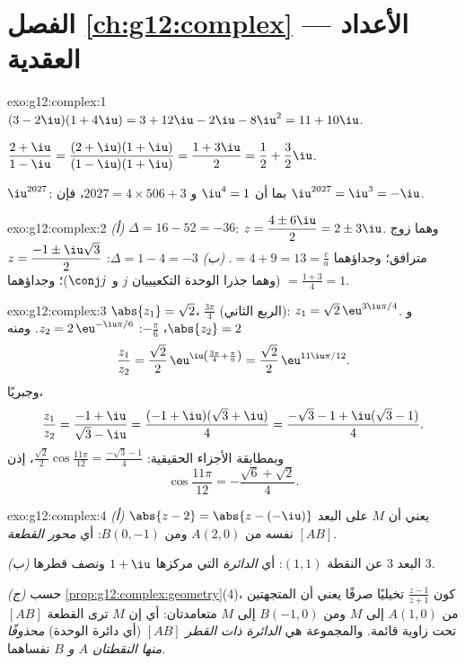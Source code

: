 \section*{الفصل \ref{ch:g12:complex} --- الأعداد العقدية}

\begin{solution}{exo:g12:complex:1}
$(3-2\iu)(1+4\iu) = 3 + 12\iu - 2\iu - 8\iu^2 = 11 + 10\iu$.

$\dfrac{2+\iu}{1-\iu} = \dfrac{(2+\iu)(1+\iu)}{(1-\iu)(1+\iu)}
= \dfrac{1 + 3\iu}{2} = \dfrac12 + \dfrac32\iu$.

$\iu^{2027}$: بما أن $\iu^4 = 1$ و $2027 = 4 \times 506 + 3$، فإن
$\iu^{2027} = \iu^3 = -\iu$.
\end{solution}

\begin{solution}{exo:g12:complex:2}
\emph{(أ)} $\Delta = 16 - 52 = -36$:
$z = \dfrac{4 \pm 6\iu}{2} = 2 \pm 3\iu$. وهما زوج مترافق؛ وجداؤهما
$= 4 + 9 = 13 = \frac ca$. \emph{(ب)} $\Delta = 1 - 4 = -3$:
$z = \dfrac{-1 \pm \iu\sqrt3}{2}$ (وهما جذرا الوحدة التكعيبيان $j$ و
$\conj j$)؛ وجداؤهما $= \frac{1 + 3}{4} = 1$.
\end{solution}

\begin{solution}{exo:g12:complex:3}
$\abs{z_1} = \sqrt2$،  $\frac{3\pi}{4}$ (الربع الثاني):
$z_1 = \sqrt2\,\eu^{3\iu\pi/4}$.
و $\abs{z_2} = 2$،  $-\frac\pi6$:
$z_2 = 2\,\eu^{-\iu\pi/6}$. ومنه
\[
\frac{z_1}{z_2} = \frac{\sqrt2}{2}\,\eu^{\iu\left(\frac{3\pi}{4} + \frac{\pi}{6}\right)}
= \frac{\sqrt2}{2}\,\eu^{11\iu\pi/12}.
\]
وجبريًا،
\[
\frac{z_1}{z_2} = \frac{-1+\iu}{\sqrt3 - \iu}
= \frac{(-1+\iu)(\sqrt3+\iu)}{4}
= \frac{-\sqrt3 - 1 + \iu(\sqrt3 - 1)}{4}.
\]
وبمطابقة الأجزاء الحقيقية:
$\frac{\sqrt2}{2}\cos\frac{11\pi}{12} = \frac{-\sqrt3-1}{4}$، إذن
\[
\cos\frac{11\pi}{12} = -\frac{\sqrt6 + \sqrt2}{4}.
\]
\end{solution}

\begin{solution}{exo:g12:complex:4}
\emph{(أ)} $\abs{z - 2} = \abs{z - (-\iu)}$ يعني أن $M$ على البعد نفسه من
$A(2, 0)$ ومن $B(0, -1)$: أي \emph{محور القطعة} $[AB]$.

\emph{(ب)} البعد $3$ عن النقطة $(1,1)$: أي \emph{الدائرة} التي مركزها
$1 + \iu$ ونصف قطرها $3$.

\emph{(ج)} حسب \cref{prop:g12:complex:geometry}(4)، كون $\frac{z-1}{z+1}$ تخيليًا
صرفًا يعني أن المتجهتين من $A(1,0)$ إلى $M$ ومن $B(-1,0)$ إلى $M$
متعامدتان: أي إن $M$ ترى القطعة $[AB]$ تحت زاوية قائمة. والمجموعة هي
\emph{الدائرة ذات القطر $[AB]$} (أي دائرة الوحدة) \emph{محذوفًا منها
النقطتان $A$ و $B$} نفساهما.
\end{solution}

